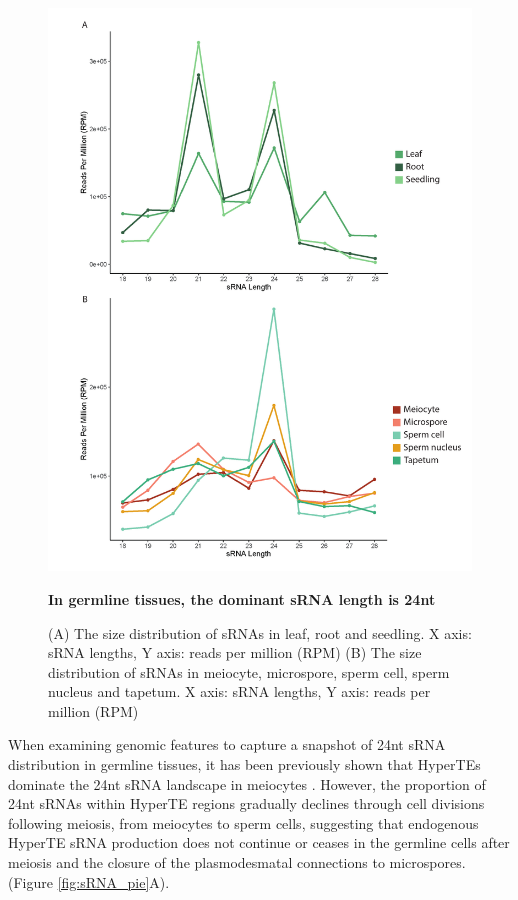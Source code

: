 \begin{figure}[htbp!] 
\centering    
    \includegraphics[width=1\textwidth]{Chapter2/Figs/Figure6_sRNA_sizes.pdf}
\caption{\textbf{In germline tissues, the dominant sRNA length is 24nt}}
\label{fig:sRNA_sizes}
\captionsetup{font=small}
    \caption*{(A) The size distribution of sRNAs in leaf, root and seedling. X axis: sRNA lengths, Y axis: reads per million (RPM) (B) The size distribution of sRNAs in meiocyte, microspore, sperm cell, sperm nucleus and tapetum. X axis: sRNA lengths, Y axis: reads per million (RPM)}
\end{figure}

When examining genomic features to capture a snapshot of 24nt sRNA distribution in germline tissues, it has been previously shown that HyperTEs dominate the 24nt sRNA landscape in meiocytes \citep{RN187}. However, the proportion of 24nt sRNAs within HyperTE regions gradually declines through cell divisions following meiosis, from meiocytes to sperm cells, suggesting that endogenous HyperTE sRNA production does not continue or ceases in the germline cells after meiosis and the closure of the plasmodesmatal connections to microspores. (Figure \ref{fig:sRNA_pie}A). 

